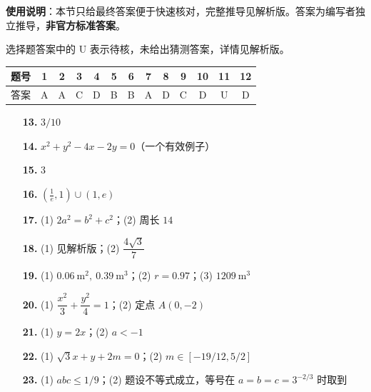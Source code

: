 
\begin{gknotice}
\textbf{使用说明}：本节只给最终答案便于快速核对，完整推导见解析版。答案为编写者独立推导，\textbf{非官方标准答案}。
\end{gknotice}

\begin{gknotice}
选择题答案中的 U 表示待核，未给出猜测答案，详情见解析版。
\end{gknotice}

\begin{center}\begin{tabular}{ccccccccccccc}
\toprule
题号 & 1 & 2 & 3 & 4 & 5 & 6 & 7 & 8 & 9 & 10 & 11 & 12 \\
\midrule
答案 & A & A & C & D & B & B & A & D & C & D & U & D \\
\bottomrule
\end{tabular}\end{center}

\begin{itemize}[leftmargin=2.6em]
  \item[\textbf{13.}] $3/10$
  \item[\textbf{14.}] $x^2+y^2-4x-2y=0$（一个有效例子）
  \item[\textbf{15.}] $3$
  \item[\textbf{16.}] $\left(\frac1e,1\right)\cup(1,e)$
\end{itemize}

\begin{itemize}[leftmargin=2.6em]
  \item[\textbf{17.}] (1) $2a^2=b^2+c^2$；(2) 周长 $14$
  \item[\textbf{18.}] (1) 见解析版；(2) $\dfrac{4\sqrt3}{7}$
  \item[\textbf{19.}] (1) $0.06\ \mathrm m^2,\ 0.39\ \mathrm m^3$；(2) $r=0.97$；(3) $1209\ \mathrm m^3$
  \item[\textbf{20.}] (1) $\dfrac{x^2}{3}+\dfrac{y^2}{4}=1$；(2) 定点 $A(0,-2)$
  \item[\textbf{21.}] (1) $y=2x$；(2) $a<-1$
\end{itemize}

\begin{itemize}[leftmargin=2.6em]
  \item[\textbf{22.}] (1) $\sqrt3x+y+2m=0$；(2) $m\in[-19/12,5/2]$
  \item[\textbf{23.}] (1) $abc\le1/9$；(2) 题设不等式成立，等号在 $a=b=c=3^{-2/3}$ 时取到
\end{itemize}
